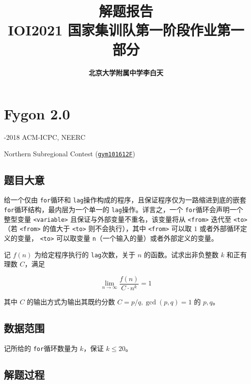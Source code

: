 \documentclass[12pt]{ctexart}
\title{\textbf{\Huge 解题报告\\
\large IOI2021 国家集训队第一阶段作业第一部分}}
\author{\textbf{北京大学附属中学\quad 李白天}}
\date{}
\begin{document}
\maketitle

\tableofcontents

\newpage

\section{Fygon 2.0}

\begin{source}-2018 ACM-ICPC, NEERC

Northern Subregional Contest (\href{https://codeforces.com/gym/101612/}{\texttt{gym101612F}})
\end{source}

\subsection{题目大意}

\newcommand{\for}{\texttt{for}}
\newcommand{\lag}{\texttt{lag}}
\providecommand*{\var}[1]{{%
\texttt{<#1>}}}

\theoremstyle{definition}
\newtheorem*{example}{\bfseries\textsf {例}}

给一个仅由 \for 循环和 \lag 操作构成的程序，且保证程序仅为一路缩进到底的嵌套 \for 循环结构，最内层为一个单一的 \lag 操作。详言之，一个 \for 循环会声明一个整型变量 \var{variable} 且保证与外部变量不重名，该变量将从 \var{from} 迭代至 \var{to}（若 \var{from} 的值大于 \var{to} 则不会执行），其中 \var{from} 可以取 $1$ 或者外部循环定义的变量，\var{to} 可以取变量 \texttt{n}（一个输入的量）或者外部定义的变量。

记 $f(n)$ 为给定程序执行的 \lag 次数，关于 $n$ 的函数。试求出非负整数 $k$ 和正有理数 $C$，满足

$$
\lim_{n\rightarrow \infty} \frac{f(n)}{C\cdot n^k} = 1
$$

其中 $C$ 的输出方式为输出其既约分数 $C=p/q, \gcd(p,q)=1$ 的 $p,q$。

\subsection{数据范围}

记所给的 \for 循环数量为 $k$，保证 $k\le 20$。

\subsection{解题过程}
\end{document}
